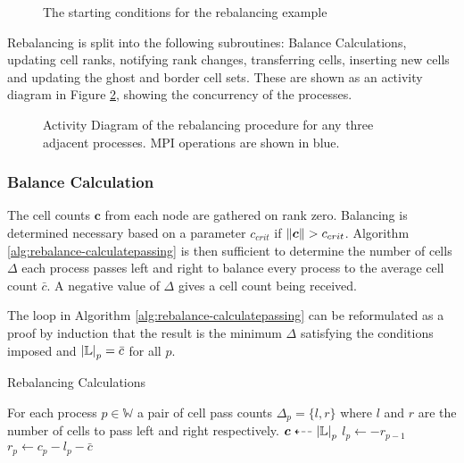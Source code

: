 \documentclass{IIBproject}
\newcommand{\vect} [1] {\bm{#1}}
\newcommand{\dla}{\dashleftarrow}
\numberwithin{figure}{section}
\begin{document}
\begin{figure}[H]
    
    \caption{The starting conditions for the rebalancing example}
    \label{fig:rebalance-init}
\end{figure}

Rebalancing is split into the following subroutines: Balance Calculations, updating cell ranks, notifying rank changes, transferring cells, inserting new cells and updating the ghost and border cell sets. These are shown as an activity diagram in Figure \ref{fig:rebalance-overview}, showing the concurrency of the processes.

\begin{figure}[H]
    
    \caption{Activity Diagram of the rebalancing procedure for any three adjacent processes. MPI operations are shown in blue.}
    \label{fig:rebalance-overview}
\end{figure}


\subsubsection{Balance Calculation}
\label{sec:rebalancing-calc}

The cell counts $\vect{c}$ from each node are gathered on rank zero. Balancing is determined necessary based on a parameter $c_{crit}$ if $\norm{\vect{c}}>c_{crit}$. Algorithm \ref{alg:rebalance-calculatepassing} is then sufficient to determine the number of cells $\Delta$ each process passes left and right to balance every process to the average cell count $\bar c$. A negative value of $\Delta$ gives a cell count being received.

The loop in Algorithm \ref{alg:rebalance-calculatepassing} can be reformulated as a proof by induction that the result is the minimum $\Delta$ satisfying the conditions imposed and $\abs{\mathbb{L}}_p=\bar c$ for all $p$.

\begin{algorithm}[H]
    \caption{Rebalancing Calculations}
    \label{alg:rebalance-calculatepassing}

    \begin{algorithmic}
        \Ensure For each process $p \in \mathbb{W}$ a pair of cell pass counts $\Delta_p = \{l,r\}$ where $l$ and $r$ are the number of cells to pass left and right respectively.
        \Statex
        \Gather $\vect{c} \dla \abs{\mathbb{L}}_p $
            \State $l_p \gets -r_{p-1}$
            \State $r_p \gets c_p - l_p - \bar{c}$
        \EndFor
    \end{algorithmic}
\end{algorithm}
\end{document}
